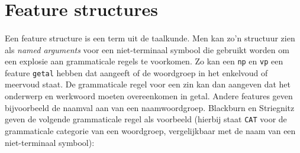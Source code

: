 


\section{Feature structures}
\label{sec:featureStructures}

\paragraph{} Een feature structure is een term uit de taalkunde. Men kan zo'n structuur zien als \textit{named arguments} voor een niet-terminaal symbool die gebruikt worden om een explosie aan grammaticale regels te voorkomen. Zo kan een \texttt{np} en \texttt{vp} een feature \texttt{getal} hebben dat aangeeft of de woordgroep in het enkelvoud of meervoud staat. De grammaticale regel voor een zin kan dan aangeven dat het onderwerp en werkwoord moeten overeenkomen in getal. Andere features geven bijvoorbeeld de naamval aan van een naamwoordgroep. Blackburn en Striegnitz \cite{NLPCourse} geven de volgende grammaticale regel als voorbeeld (hierbij staat \texttt{CAT} voor de grammaticale categorie van een woordgroep, vergelijkbaar met de naam van een niet-terminaal symbool):

